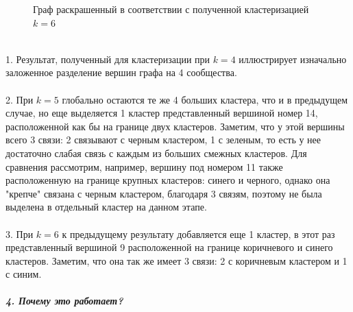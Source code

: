 \documentclass[a5paper, 10pt]{article}
\theoremstyle{definition}
\theoremstyle{plain}
\theoremstyle{remark}
\begin{document}
\begin{figure}[h!]
\caption{Граф раскрашенный в соответствии с полученной кластеризацией $k=6$}
\end{figure}
\\
1. Результат, полученный для кластеризации при $k=4$ иллюстрирует изначально заложенное разделение вершин графа на 4 сообщества.\\
\\2. При $k=5$ глобально остаются те же 4 больших кластера, что и в предыдущем случае, но еще выделяется 1 кластер представленный вершиной номер 14, расположенной как бы на границе двух кластеров. Заметим, что у этой вершины всего 3 связи: 2 связывают с черным кластером, 1 с зеленым, то есть у нее достаточно слабая связь с каждым из больших смежных кластеров. Для сравнения рассмотрим, например, вершину под номером 11 также расположенную на границе крупных кластеров: синего и черного, однако она "крепче" связана с черным кластером, благодаря 3 связям, поэтому не была выделена в отдельный кластер на данном этапе.\\
\\3. При $k=6$ к предыдущему результату добавляется еще 1 кластер, в этот раз представленный вершиной 9 расположенной на границе коричневого и синего кластеров. Заметим, что она так же имеет 3 связи: 2 с коричневым кластером и 1 с синим.\\
\\
\textbf{\textit{4. Почему это работает?}}

\newpage
\end{document}
